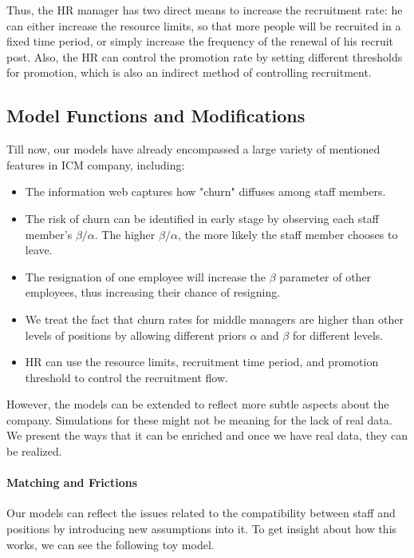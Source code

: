 \documentclass[tcn = 37075, sheet = false, abstract = false]{mcmthesis}
\begin{document}
Thus, the HR manager has two direct means to increase the recruitment rate: he can either increase the resource limits, so that more people will be recruited in a fixed time period, or simply increase the frequency of the renewal of his recruit post. Also, the HR can control the promotion rate by setting different thresholds for promotion, which is also an indirect method of controlling recruitment. 



\subsection{Model Functions and Modifications}

Till now, our models have already encompassed a large variety of mentioned features in ICM company, including:

\begin{itemize}
\item The information web captures how "churn" diffuses among staff members.
\item The risk of churn can be identified in early stage by observing each staff member's $\beta/\alpha$. The higher $\beta/\alpha$, the more likely the staff member chooses to leave.
\item The resignation of one employee will increase the $\beta$ parameter of other employees, thus increasing their chance of resigning.
\item We treat the fact that churn rates for middle managers are higher than other levels of positions by allowing different priors $\alpha$ and $\beta$ for different levels.
\item HR can use the resource limits, recruitment time period, and promotion threshold to control the recruitment flow.
\end{itemize}

However, the models can be extended to reflect more subtle aspects about the company. Simulations for these might not be meaning for the lack of real data. We present the ways that it can be enriched and once we have real data, they can be realized.


\paragraph{Matching and Frictions} 

Our models can reflect the issues related to the compatibility between staff and positions by introducing new assumptions into it. To get insight  about how this works, we can see the following toy model. 
\end{document}
